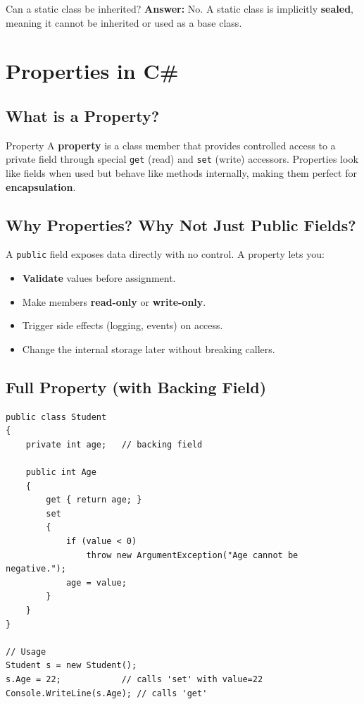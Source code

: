 \documentclass[11pt,a4paper]{article}
\begin{document}
\begin{intqBox}{Can a static class be inherited?}
\textbf{Answer:} No. A static class is implicitly \textbf{sealed}, meaning it cannot be inherited or used as a base class.
\end{intqBox}

\clearpage
\section{Properties in C\#}

\subsection{What is a Property?}

\begin{defnBox}{Property}
A \textbf{property} is a class member that provides controlled access to a private field through special \texttt{get} (read) and \texttt{set} (write) accessors. Properties look like fields when used but behave like methods internally, making them perfect for \textbf{encapsulation}.
\end{defnBox}

\subsection{Why Properties? Why Not Just Public Fields?}

A \texttt{public} field exposes data directly with no control. A property lets you:
\begin{itemize}[leftmargin=*]
    \item \textbf{Validate} values before assignment.
    \item Make members \textbf{read-only} or \textbf{write-only}.
    \item Trigger side effects (logging, events) on access.
    \item Change the internal storage later without breaking callers.
\end{itemize}

\subsection{Full Property (with Backing Field)}

\begin{lstlisting}[caption={Property with private backing field and validation}]
public class Student
{
    private int age;   // backing field

    public int Age
    {
        get { return age; }
        set
        {
            if (value < 0)
                throw new ArgumentException("Age cannot be negative.");
            age = value;
        }
    }
}

// Usage
Student s = new Student();
s.Age = 22;            // calls 'set' with value=22
Console.WriteLine(s.Age); // calls 'get'
\end{lstlisting}
\end{document}
